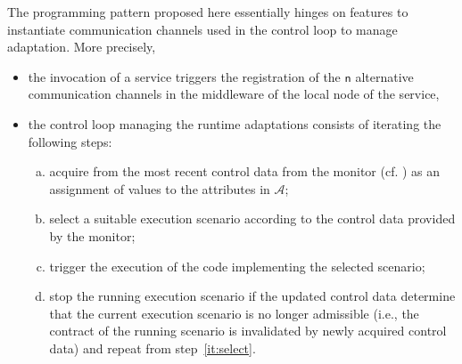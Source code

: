 The programming pattern proposed here essentially hinges on \SEArch
features to instantiate communication channels used in the control
loop to manage adaptation.
%
More precisely,
%
\begin{itemize}
\item the invocation of a service triggers the
  registration of the $\mathsf{n}$ alternative communication channels in the 
 middleware of the  local node of the service,
\item the control loop managing the runtime adaptations consists of
  iterating the following steps:
  \begin{enumerate}[a.]
  \item acquire from the most recent control data from the monitor (cf. \cite{bcglv12})
	 as an assignment of values to the attributes in $\mathcal A$;
  \item\label{it:select} select a suitable execution scenario
	 according to the control data provided by the monitor;
  \item trigger the execution of the code implementing the selected scenario;
  \item stop the running execution scenario if the updated control data 
          determine that the current execution scenario is no longer admissible
	 (i.e., the contract of the running scenario is invalidated by
	 newly acquired control data) and repeat from step~\ref{it:select}.
  \end{enumerate}
\end{itemize}

